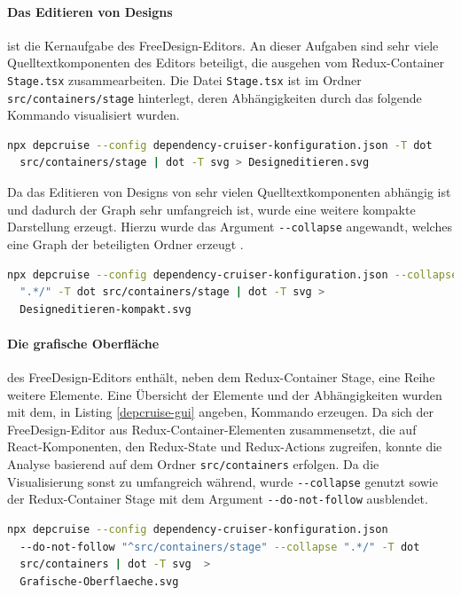 \paragraph{Das Editieren von Designs} ist die Kernaufgabe des FreeDesign-Editors. 
An dieser Aufgaben sind sehr viele Quelltextkomponenten des Editors beteiligt, die ausgehen vom Redux-Container \lstinline|Stage.tsx| zusammearbeiten. Die Datei \lstinline|Stage.tsx| ist im Ordner \lstinline|src/containers/stage| hinterlegt, deren Abhängigkeiten durch das folgende Kommando visualisiert wurden.
\begin{lstlisting}[language={sh}, label=depcruise-design-edit, caption=Visualisierung der Abhängigkeiten für den Quelletext zum editieren des Designs]
npx depcruise --config dependency-cruiser-konfiguration.json -T dot  
  src/containers/stage | dot -T svg > Designeditieren.svg      
\end{lstlisting}
Da das Editieren von Designs von sehr vielen Quelltextkomponenten abhängig ist und dadurch der Graph sehr umfangreich ist, wurde eine weitere kompakte Darstellung erzeugt. Hierzu wurde das Argument \lstinline|--collapse| angewandt, welches eine Graph der beteiligten Ordner erzeugt \autocite[vgl.][]{Verweij:CLI}. 
\begin{lstlisting}[language={sh}, label=depcruise-design-edit-compact, caption=Visualisierung der Abhängigkeiten für den Quelletext zum editieren des Designs]
npx depcruise --config dependency-cruiser-konfiguration.json --collapse 
  ".*/" -T dot src/containers/stage | dot -T svg > 
  Designeditieren-kompakt.svg
\end{lstlisting}

\paragraph{Die grafische Oberfläche} des FreeDesign-Editors
enthält, neben dem Redux-Container Stage, eine Reihe weitere Elemente. Eine Übersicht der Elemente und der Abhängigkeiten wurden mit dem, in Listing \ref{depcruise-gui} angeben, Kommando erzeugen. Da sich der FreeDesign-Editor aus Redux-Container-Elementen zusammensetzt, die auf React-Komponenten, den Redux-State und Redux-Actions zugreifen, konnte die Analyse basierend auf dem Ordner \lstinline|src/containers| erfolgen. Da die Visualisierung sonst zu umfangreich während, wurde \lstinline|--collapse| genutzt sowie der Redux-Container Stage mit dem Argument \lstinline|--do-not-follow| ausblendet.

\begin{lstlisting}[language={sh}, label=depcruise-gui, caption=Visualisierung der Zusammenhänge der grafischen Elemente des Editors]
npx depcruise --config dependency-cruiser-konfiguration.json 
  --do-not-follow "^src/containers/stage" --collapse ".*/" -T dot 
  src/containers | dot -T svg  > 
  Grafische-Oberflaeche.svg
\end{lstlisting}

